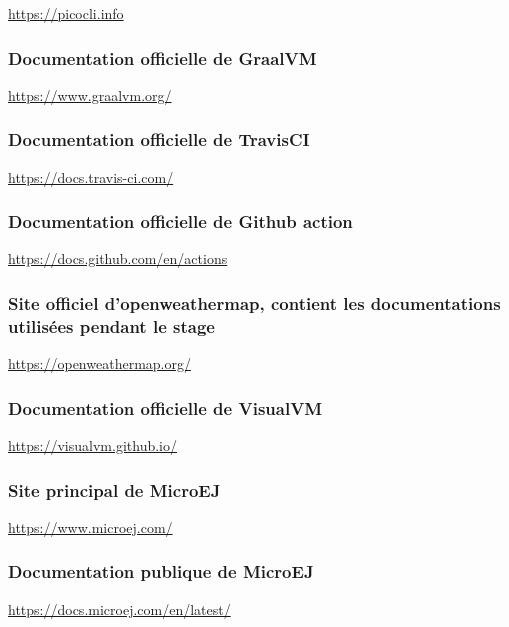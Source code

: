 \documentclass[french,a4paper,12pt]{report}
\begin{document}
\href{https://picocli.info}{https://picocli.info}

\subsubsection{Documentation officielle de GraalVM}

\href{https://www.graalvm.org/}{https://www.graalvm.org/}

\subsubsection{Documentation officielle de TravisCI}

\href{https://docs.travis-ci.com/}{https://docs.travis-ci.com/}

\subsubsection{Documentation officielle de Github action}

\href{https://docs.github.com/en/actions}{https://docs.github.com/en/actions}

\subsubsection{Site officiel d'openweathermap, contient les documentations utilisées pendant le stage}

\href{https://openweathermap.org/}{https://openweathermap.org/}

\subsubsection{Documentation officielle de VisualVM}

\href{https://visualvm.github.io/}{https://visualvm.github.io/}

\subsubsection{Site principal de MicroEJ}

\href{https://www.microej.com/}{https://www.microej.com/}

\subsubsection{Documentation publique de MicroEJ}

\href{https://docs.microej.com/en/latest/}{https://docs.microej.com/en/latest/}
\end{document}

